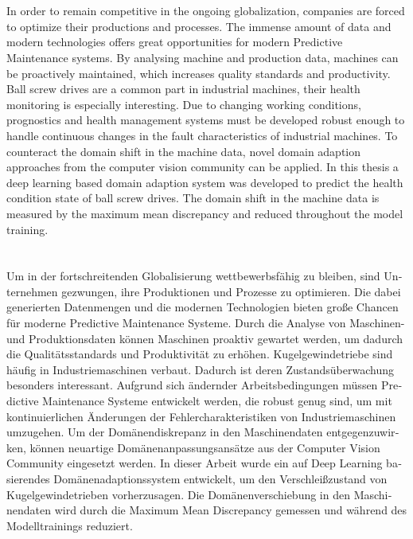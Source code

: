 \chapter{\abstractname}

In order to remain competitive in the ongoing globalization, companies are forced to optimize their productions and processes. The immense amount of data and modern technologies offers great opportunities for modern Predictive Maintenance systems. By analysing machine and production data, machines can be proactively maintained, which increases quality standards and productivity. Ball screw drives are a common part in industrial machines, their health monitoring is especially interesting. Due to changing working conditions, prognostics and health management systems must be developed robust enough to handle continuous changes in the fault characteristics of industrial machines. To counteract the domain shift in the machine data, novel domain adaption approaches from the computer vision community can be applied. In this thesis a deep learning based domain adaption system was developed to predict the health condition state of ball screw drives. The domain shift in the machine data is measured by the maximum mean discrepancy and reduced throughout the model training.

\makeatletter
{}
{\renewcommand{\abstractname}{Kurzfassung}}
{\renewcommand{\abstractname}{Abstract}}
\makeatother

\chapter{\abstractname}

\begin{otherlanguage}{ngerman} %
Um in der fortschreitenden Globalisierung wettbewerbsfähig zu bleiben, sind Unternehmen gezwungen, ihre Produktionen und Prozesse zu optimieren. Die dabei generierten Datenmengen und die modernen Technologien bieten große Chancen für moderne Predictive Maintenance Systeme. Durch die Analyse von Maschinen- und Produktionsdaten können Maschinen proaktiv gewartet werden, um dadurch die Qualitätsstandards und Produktivität zu erhöhen. Kugelgewindetriebe sind häufig in Industriemaschinen verbaut. Dadurch ist deren Zustandsüberwachung besonders interessant. Aufgrund sich ändernder Arbeitsbedingungen müssen Predictive Maintenance Systeme entwickelt werden, die robust genug sind, um mit kontinuierlichen Änderungen der Fehlercharakteristiken von Industriemaschinen umzugehen. Um der Domänendiskrepanz in den Maschinendaten entgegenzuwirken, können neuartige Domänenanpassungsansätze aus der Computer Vision Community eingesetzt werden. In dieser Arbeit wurde ein auf Deep Learning basierendes Domänenadaptionssystem entwickelt, um den Verschleißzustand von Kugelgewindetrieben vorherzusagen. Die Domänenverschiebung in den Maschinendaten wird durch die Maximum Mean Discrepancy gemessen und während des Modelltrainings reduziert.


\end{otherlanguage}


\makeatletter
{}
{\renewcommand{\abstractname}{Abstract}}
{\renewcommand{\abstractname}{Kurzfassung}}
\makeatother